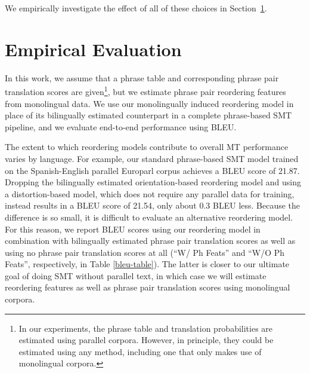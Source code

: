 \documentclass[11pt,letterpaper]{article}
\newcommand{\todo}[1]{\textcolor{red}{TODO: #1}}
\newcommand{\secref}[1]{Section~\ref{#1}}
\begin{document}
We empirically investigate the effect of all of these choices in \secref{sect:eval}.

\section{Empirical Evaluation} \label{sect:eval}

In this work, we assume that a phrase table and corresponding phrase pair translation scores are given\footnote{In our experiments, the phrase table and translation probabilities are estimated using parallel corpora. However, in principle, they could be estimated using any method, including one that only makes use of monolingual corpora.}, but we estimate phrase pair reordering features from monolingual data.  We use our monolingually induced reordering model in place of its bilingually estimated counterpart in a complete phrase-based SMT pipeline, and we evaluate end-to-end performance using BLEU. 

The extent to which reordering models contribute to overall MT performance varies by language. For example, our standard phrase-based SMT model trained on the Spanish-English parallel Europarl corpus achieves a BLEU score of 21.87. Dropping the bilingually estimated orientation-based reordering model and using a distortion-based model, which does not require any parallel data for training, instead results in a BLEU score of 21.54, only about 0.3 BLEU less. Because the difference is so small, it is difficult to evaluate an alternative reordering model. For this reason, we report BLEU scores using our reordering model in combination with bilingually estimated phrase pair translation scores as well as using no phrase pair translation scores at all (``W/ Ph Feats'' and ``W/O Ph Feats'', respectively, in Table \ref{bleu-table}). The latter is closer to our ultimate goal of doing SMT without parallel text, in which case we will estimate reordering features as well as phrase pair translation scores using monolingual corpora.

\end{document}
